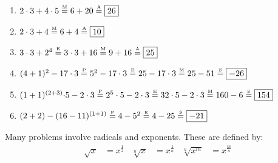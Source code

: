 \documentclass[crop=false,class=book,oneside]{standalone}
\begin{document}
            \begin{fexample}{}{}
                \begin{enumerate}
                    \item ${2}\cdot{3}+{4}\cdot{5}%
                           \overset{\textrm{\tiny{M}}}{=}%
                           6+20\overset{\textrm{\tiny{A}}}{=}%
                           \boxed{26}$
                    \item ${2}\cdot{3}%
                           +4\overset{\textrm{\tiny{M}}}{=}%
                           6+4\overset{\textrm{\tiny{A}}}{=}%
                           \boxed{10}$
                    \item ${3}\cdot{3+2^{4}}%
                           \overset{\textrm{\tiny{E}}}{=}%
                           {3}\cdot {3}+16%
                           \overset{\textrm{\tiny{M}}}{=}%
                           9+16\overset{\textrm{\tiny{A}}}{=}%
                           \boxed{25}$
                    \item $(4+1)^2-17\cdot 3%
                        \overset{\textrm{\tiny{P}}}{=}%
                        5^{2}-17\cdot 3%
                        \overset{\textrm{\tiny{E}}}{=}25-17\cdot 3%
                        \overset{\textrm{\tiny{M}}}{=}25-51%
                        \overset{\textrm{\tiny{S}}}{=}\boxed{-26}$
                    \item ${(1+1)^{(2+3)}\cdot}{5}-%
                           {2}\cdot{3}
                           \overset{\textrm{\tiny{P}}}{=}%
                           {2^{5}}\cdot{5}-{2}\cdot{3}%
                           \overset{\textrm{\tiny{E}}}{=}%
                           {32}\cdot{5}-{2}\cdot{3}%
                           \overset{\textrm{\tiny{M}}}{=}%
                           160-6\overset{\textrm{\tiny{S}}}{=}%
                           \boxed{154}$
                    \item $(2+2)-(16-11)^{(1+1)}%
                           \overset{\textrm{\tiny{P}}}{=}4-5^{2}%
                           \overset{\textrm{\tiny{E}}}{=}4-25%
                           \overset{\textrm{\tiny{S}}}{=}%
                           \boxed{-21}$
                \end{enumerate}
            \end{fexample}
            Many problems involve radicals and exponents.
            These are defined by:
            \begin{align*}
                \sqrt{x}&=x^{\frac{1}{2}}
                &
                \sqrt[n]{x}&=x^{\frac{1}{n}}
                &
                \sqrt[n]{x^m}&=x^{\frac{m}{n}}
            \end{align*}
\end{document}
